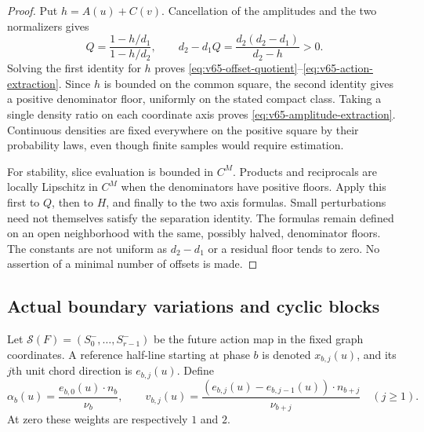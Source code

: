 \begin{proof}
Put $h=A(u)+C(v)$.  Cancellation of the amplitudes and the two
normalizers gives
\[
 Q=\frac{1-h/d_1}{1-h/d_2},\qquad
 d_2-d_1Q=\frac{d_2(d_2-d_1)}{d_2-h}>0.
\]
Solving the first identity for $h$ proves
\eqref{eq:v65-offset-quotient}--\eqref{eq:v65-action-extraction}.
Since $h$ is bounded on the common square, the second identity gives a
positive denominator floor, uniformly on the stated compact class.
Taking a single density ratio on each coordinate axis proves
\eqref{eq:v65-amplitude-extraction}.  Continuous densities are fixed
everywhere on the positive square by their probability laws, even though
finite samples would require estimation.

For stability, slice evaluation is bounded in $C^M$.  Products and
reciprocals are locally Lipschitz in $C^M$ when the denominators have
positive floors.  Apply this first to $Q$, then to $H$, and finally to
the two axis formulas.  Small perturbations need not themselves satisfy
the separation identity.  The formulas remain defined on an open
neighborhood with the same, possibly halved, denominator floors.
The constants are not uniform as $d_2-d_1$ or a residual floor tends
to zero.  No assertion of a minimal number of offsets is made.
\end{proof}

\subsection{Actual boundary variations and cyclic blocks}

Let $\mathcal S(F)=(S_0^-,\ldots,S_{r-1}^-)$ be the future action
map in the fixed graph coordinates.  A reference half-line starting at
phase $b$ is denoted $x_{b,j}(u)$, and its $j$th unit chord direction
is $e_{b,j}(u)$.  Define
\begin{equation}\label{eq:v65-visit-weights}
 \alpha_b(u)=\frac{e_{b,0}(u)\cdot n_b}{\nu_b},\qquad
 v_{b,j}(u)=\frac{(e_{b,j}(u)-e_{b,j-1}(u))\cdot n_{b+j}}
                        {\nu_{b+j}}\quad(j\ge1).
\end{equation}
At zero these weights are respectively $1$ and $2$.

